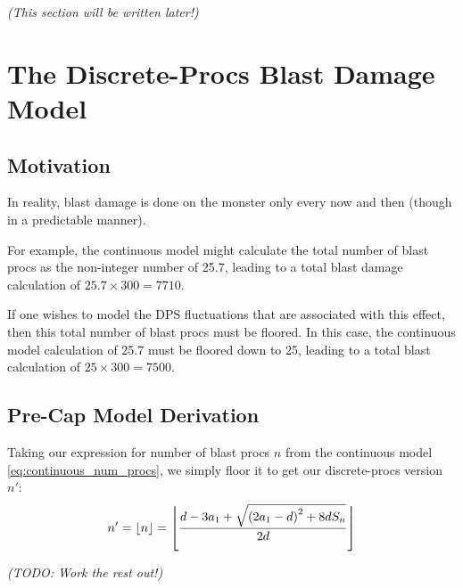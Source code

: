 \documentclass{article}
\begin{document}
\textit{(This section will be written later!)}


\newpage


\section{The Discrete-Procs Blast Damage Model}%
\label{sec:the_discrete_procs_blast_damage_model}


\subsection{Motivation}%
\label{sub:motivation}

In reality, blast damage is done on the monster only every now and then (though in a predictable manner).

For example, the continuous model might calculate the total number of blast procs as the non-integer number of 25.7, leading to a total blast damage calculation of $25.7 \times 300 = 7710$.

If one wishes to model the DPS fluctuations that are associated with this effect, then this total number of blast procs must be floored. In this case, the continuous model calculation of 25.7 must be floored down to 25, leading to a total blast calculation of $25 \times 300 = 7500$.


\subsection{Pre-Cap Model Derivation}%
\label{sub:dbm_pre_cap_model_derivation}

Taking our expression for number of blast procs $n$ from the continuous model \eqref{eq:continuous_num_procs}, we simply floor it to get our discrete-procs version $n'$:
\begin{equation}
    n' = \floor*{n} = \floor*{\frac{d - 3 a_1 + \sqrt{\parens*{2 a_1 - d}^2 + 8 d S_n}}{2 d}}
\end{equation}

\textit{(TODO: Work the rest out!)}
\end{document}

